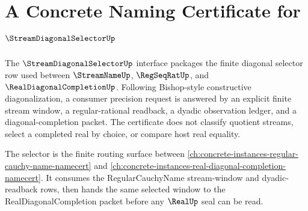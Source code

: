 \chapter{A Concrete Naming Certificate for $\StreamDiagonalSelectorUp$}
\label{ch:concrete-instances-stream-diagonal-selector-namecert}

The $\StreamDiagonalSelectorUp$ interface packages the finite diagonal selector row used between $\StreamNameUp$, $\RegSeqRatUp$, and $\RealDiagonalCompletionUp$. Following Bishop-style constructive diagonalization, a consumer precision request is answered by an explicit finite stream window, a regular-rational readback, a dyadic observation ledger, and a diagonal-completion packet. The certificate does not classify quotient streams, select a completed real by choice, or compare host real equality.

The selector is the finite routing surface between \autoref{ch:concrete-instances-regular-cauchy-name-namecert} and \autoref{ch:concrete-instances-real-diagonal-completion-namecert}. It consumes the RegularCauchyName stream-window and dyadic-readback rows, then hands the same selected window to the RealDiagonalCompletion packet before any $\RealUp$ seal can be read.

